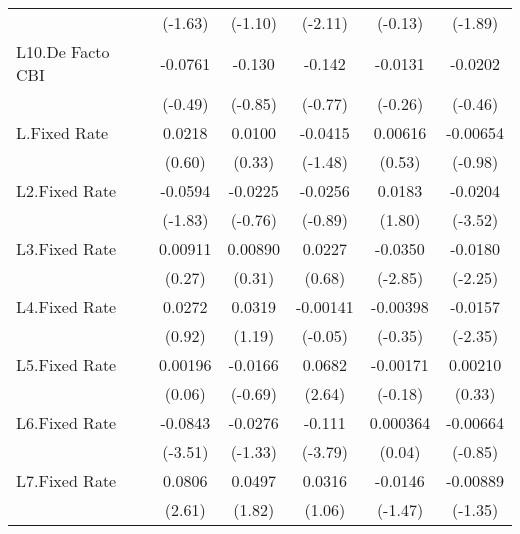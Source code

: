 {\begin{longtable}{l*{5}{c}}
                &  (-1.63)         &  (-1.10)         &  (-2.11)         &  (-0.13)         &  (-1.89)         \\
[1em]
L10.De Facto CBI&  -0.0761         &   -0.130         &   -0.142         &  -0.0131         &  -0.0202         \\
                &  (-0.49)         &  (-0.85)         &  (-0.77)         &  (-0.26)         &  (-0.46)         \\
[1em]
L.Fixed Rate    &   0.0218         &   0.0100         &  -0.0415         &  0.00616         & -0.00654         \\
                &   (0.60)         &   (0.33)         &  (-1.48)         &   (0.53)         &  (-0.98)         \\
[1em]
L2.Fixed Rate   &  -0.0594         &  -0.0225         &  -0.0256         &   0.0183         &  -0.0204\sym{***}\\
                &  (-1.83)         &  (-0.76)         &  (-0.89)         &   (1.80)         &  (-3.52)         \\
[1em]
L3.Fixed Rate   &  0.00911         &  0.00890         &   0.0227         &  -0.0350\sym{**} &  -0.0180\sym{*}  \\
                &   (0.27)         &   (0.31)         &   (0.68)         &  (-2.85)         &  (-2.25)         \\
[1em]
L4.Fixed Rate   &   0.0272         &   0.0319         & -0.00141         & -0.00398         &  -0.0157\sym{*}  \\
                &   (0.92)         &   (1.19)         &  (-0.05)         &  (-0.35)         &  (-2.35)         \\
[1em]
L5.Fixed Rate   &  0.00196         &  -0.0166         &   0.0682\sym{**} & -0.00171         &  0.00210         \\
                &   (0.06)         &  (-0.69)         &   (2.64)         &  (-0.18)         &   (0.33)         \\
[1em]
L6.Fixed Rate   &  -0.0843\sym{***}&  -0.0276         &   -0.111\sym{***}& 0.000364         & -0.00664         \\
                &  (-3.51)         &  (-1.33)         &  (-3.79)         &   (0.04)         &  (-0.85)         \\
[1em]
L7.Fixed Rate   &   0.0806\sym{*}  &   0.0497         &   0.0316         &  -0.0146         & -0.00889         \\
                &   (2.61)         &   (1.82)         &   (1.06)         &  (-1.47)         &  (-1.35)         \\

\end{longtable}}
